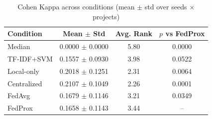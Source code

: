 \begin{table}[h]
\centering
\caption{Cohen Kappa across conditions (mean $\pm$ std over seeds $\times$ projects)}
\begin{tabular}{lccc}
\toprule
Condition & Mean $\pm$ Std & Avg. Rank & $p$ vs FedProx \\
\midrule
Median & 0.0000 $\pm$ 0.0000 & 5.80 & 0.0000 \\
TF-IDF+SVM & 0.1557 $\pm$ 0.0930 & 3.98 & 0.0522 \\
Local-only & 0.2018 $\pm$ 0.1251 & 2.31 & 0.0064 \\
Centralized & 0.2107 $\pm$ 0.1049 & 2.26 & 0.0001 \\
FedAvg & 0.1679 $\pm$ 0.1146 & 3.21 & 0.0349 \\
FedProx & 0.1658 $\pm$ 0.1143 & 3.44 & -- \\
\bottomrule
\end{tabular}
\end{table}
